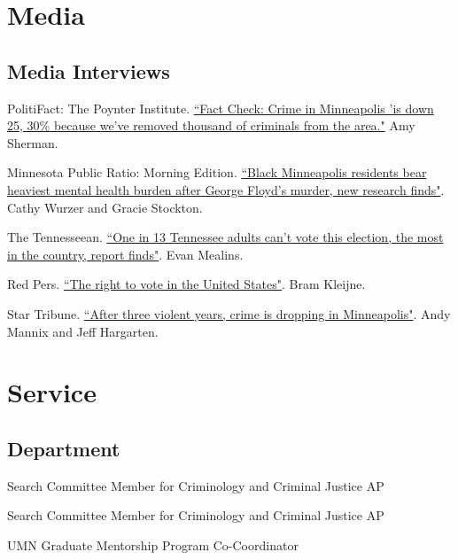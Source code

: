 \documentclass[letterpaper]{article}
\newenvironment{publist}{%
  \begin{list}{}{%
    \setlength{\leftmargin}{0cm}   %
    \setlength{\labelwidth}{2cm}     %
    \setlength{\labelsep}{0.5cm}     %
  }%
}{%
  \end{list}%
}
\begin{document}
\section*{\textbf{Media}}

\subsection*{Media Interviews}
\begin{publist} 

\item[\textbf{2026}] PolitiFact: The Poynter Institute. \href{https://www.politifact.com/factchecks/2026/feb/13/donald-trump/Minneapolis-Minnesota-immigration-crime-drop/}{``Fact Check: Crime in Minneapolis 'is down 25, 30\% because we've removed thousand of criminals from the area."} Amy Sherman. 

\item[\textbf{2024}] Minnesota Public Ratio: Morning Edition. \href{https://www.mprnews.org/story/2024/09/19/black-minneapolis-residents-bear-heaviest-mental-health-burden-after-george-floyds-murder}{``Black Minneapolis residents bear heaviest mental health burden after George Floyd’s murder, new research finds"}. Cathy Wurzer and Gracie Stockton.  

\item The Tennesseean. \href{https://www.tennessean.com/story/news/2024/10/10/tn-has-highest-felony-disenfranchisement-rate-in-nation-report-finds/75597410007/}{``One in 13 Tennessee adults can't vote this election, the most in the country, report finds"}. Evan Mealins. 

\item Red Pers. \href{https://redpers.nl/}{``The right to vote in the United States"}. Bram Kleijne.

\item[\textbf{2023}] Star Tribune. \href{https://www.startribune.com/after-three-most-violent-years-minneapolis-saw-drop-in-crime-summer-but-were-not-back-to-normal-yet/600301635/}{``After three violent years, crime is dropping in Minneapolis"}. Andy Mannix and Jeff Hargarten.  

\end{publist}

\section*{\textbf{Service}}

\subsection*{Department}
\begin{publist}

\item[\textbf{2023}] Search Committee Member for Criminology and Criminal Justice AP
\item[\textbf{2022}] Search Committee Member for Criminology and Criminal Justice AP
\item[\textbf{2017}] UMN Graduate Mentorship Program Co-Coordinator

\end{publist}
\end{document}
